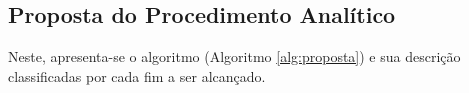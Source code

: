    \subsection{Proposta do Procedimento Analítico} \label{sec:proposta}

      Neste, apresenta-se o algoritmo (Algoritmo \ref{alg:proposta}) e sua descrição classificadas por cada fim a ser alcançado.

